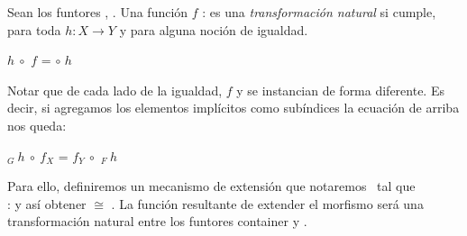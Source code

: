 \begin{definition} Sean los funtores ,   \AgdaSymbol{:}  \AgdaSymbol{$\to$} . Una función $f$ : \AgdaSymbol{$\forall$}   \AgdaSymbol{$\to$}   es una {\it transformación natural} si cumple, para toda $h : X \to Y$ y para alguna noción de igualdad.

\sangrar
{} $h\ \circ$ $f$ =  $\circ$  $h$

Notar que de cada lado de la igualdad, $f$ y  se instancian de forma diferente. Es decir, si agregamos los elementos implícitos como subíndices la ecuación de arriba nos queda: 

\sangrar
{}$_{G}\ h\ \circ\ f_{X}$ = $f_{Y}\ \circ$ $_{F}\ h$
\end{definition}

Para ello, definiremos un mecanismo de extensión que notaremos\ \agdaExtMorph{$\_$} tal que\\
 : \AgdaSymbol{$\forall$}   \AgdaSymbol{$\to$}  
y así obtener
 $\cong$ . La función  resultante de extender el morfismo  será una transformación natural entre los funtores container  y .

\vspace{2ex}

